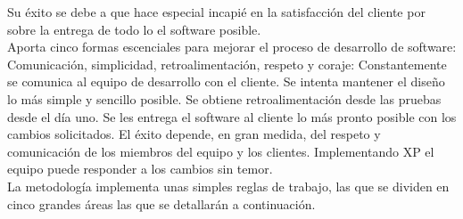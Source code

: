 Su éxito se debe a que hace especial incapié en la satisfacción del cliente por sobre la entrega de todo lo el software posible.\\

Aporta cinco formas escenciales para mejorar el proceso de desarrollo de software: Comunicación, simplicidad, retroalimentación, respeto y coraje: Constantemente se comunica al equipo de desarrollo con el cliente. Se intenta mantener el diseño lo más simple y sencillo posible. Se obtiene retroalimentación desde las pruebas desde el día uno. Se les entrega el software al cliente lo más pronto posible con los cambios solicitados. El éxito depende, en gran medida, del respeto y comunicación de los miembros del equipo y los clientes. Implementando XP el equipo puede responder a los cambios sin temor.\\

La metodología implementa unas simples reglas de trabajo, las que se dividen en cinco grandes áreas las que se detallarán a continuación.\\

